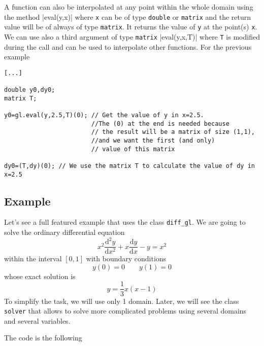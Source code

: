 A function can also be interpolated at any point within the whole domain using the method
|eval(y,x)|
where \texttt{x} can be of type \texttt{double} or \texttt{matrix} and the return value will be 
of always of type \texttt{matrix}. It returns the value of \texttt{y} at the point(s) \texttt{x}.
We can use also a third argument of type \texttt{matrix}
|eval(y,x,T)|
where \texttt{T} is modified during the call and can be used to interpolate other functions. 
For the previous example
\begin{verbatim}
[...]

double y0,dy0;
matrix T;

y0=gl.eval(y,2.5,T)(0); // Get the value of y in x=2.5. 
						//The (0) at the end is needed because
						// the result will be a matrix of size (1,1), 
						//and we want the first (and only)
						// value of this matrix
								
dy0=(T,dy)(0); // We use the matrix T to calculate the value of dy in x=2.5

\end{verbatim}

\subsection{Example}

Let's see a full featured example that uses the class \texttt{diff\_gl}.
We are going to solve the ordinary differential equation
$$x^2\frac{\mathrm{d}^2y}{\mathrm{d}x^2}+x\frac{\mathrm{d}y}{\mathrm{d}x}-y=x^2$$
within the interval $[0,1]$ with boundary conditions
$$y(0)=0 \qquad y(1)=0$$
whose exact solution is
$$y=\frac{1}{3}x(x-1)$$
To simplify the task, we will use only 1 domain. Later, we will see the class \texttt{solver} that
allows to solve more complicated problems using several domains and several variables.

The code is the following

